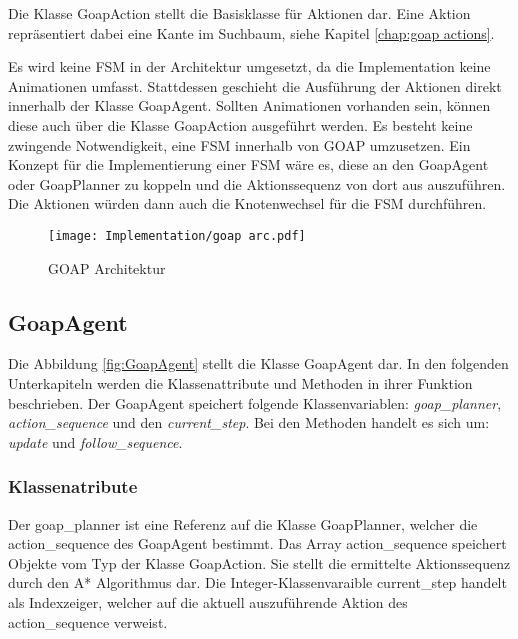 Die Klasse GoapAction stellt die Basisklasse für Aktionen dar. Eine Aktion repräsentiert dabei eine Kante im Suchbaum, siehe Kapitel \ref{chap:goap actions}.

Es wird keine FSM in der Architektur umgesetzt, da die Implementation keine Animationen umfasst. Stattdessen geschieht die Ausführung der Aktionen direkt innerhalb der Klasse GoapAgent. Sollten Animationen vorhanden sein, können diese auch über die Klasse GoapAction ausgeführt werden. Es besteht keine zwingende Notwendigkeit, eine FSM innerhalb von GOAP umzusetzen. Ein Konzept für die Implementierung einer FSM wäre es, diese an den GoapAgent oder GoapPlanner zu koppeln und die Aktionssequenz von dort aus auszuführen. Die Aktionen würden dann auch die Knotenwechsel für die FSM durchführen.

\begin{figure}[h]
  \centering
  \texttt{[image: Implementation/goap arc.pdf]}
	\captionsetup{justification=justified, format=plain}
  \caption{GOAP Architektur}
  \label{fig:GOAP Architektur}
\end{figure}

\subsection{GoapAgent}
\label{chap:goapagent uml}

Die Abbildung \ref{fig:GoapAgent} stellt die Klasse GoapAgent dar. In den folgenden Unterkapiteln werden die Klassenattribute und Methoden in ihrer Funktion beschrieben. Der GoapAgent speichert folgende Klassenvariablen: \textit{goap\_planner}, \textit{action\_sequence} und den \textit{current\_step}. Bei den Methoden handelt es sich um: \textit{update} und \textit{follow\_sequence}.

\subsubsection{Klassenatribute}
\label{chap:goapagent klassenatribute}

Der goap\_planner ist eine Referenz auf die Klasse GoapPlanner, welcher die action\_sequence des GoapAgent bestimmt. Das Array action\_sequence speichert Objekte vom Typ der Klasse GoapAction. Sie stellt die ermittelte Aktionssequenz durch den A* Algorithmus dar. Die Integer-Klassenvaraible current\_step handelt als Indexzeiger, welcher auf die aktuell auszuführende Aktion des action\_sequence verweist.

